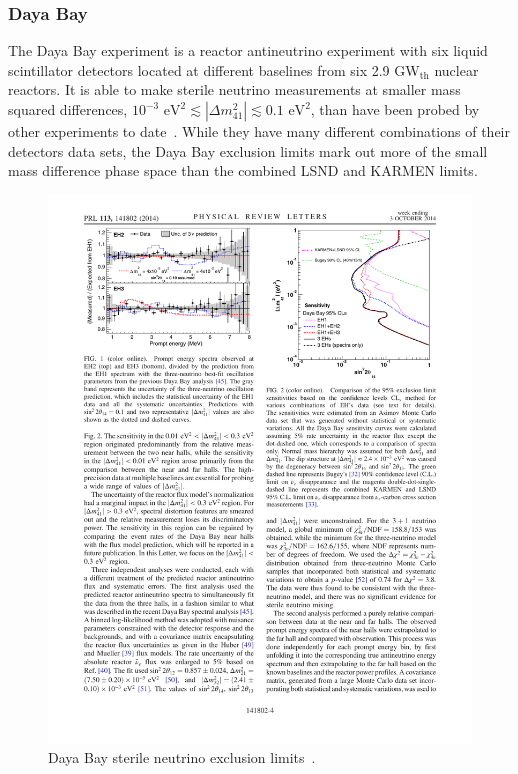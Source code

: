 \documentclass[aps,prd,twocolumn,nofootinbib]{revtex4-1}
\begin{document}
\subsubsection{Daya Bay}
The Daya Bay experiment is a reactor antineutrino experiment with six liquid scintillator detectors located at different baselines from six 2.9 GW$_\text{th}$ nuclear reactors. It is able to make sterile neutrino measurements at smaller mass squared differences, $10^{−3} \text{ eV}^2  \lesssim \left|\Delta m^{2}_{41}\right| \lesssim 0.1 \text{ eV}^2$, than have been probed by other experiments to date~\cite{DayaBay}. While they have many different combinations of their detectors data sets, the Daya Bay exclusion limits mark out more of the small mass difference phase space than the combined LSND and KARMEN limits.

\begin{figure}[H]
  \centering
  \includegraphics[width=1\columnwidth]{../figures/daya1.pdf}
  \caption{Daya Bay sterile neutrino exclusion limits~\cite{DayaBay}.}
  \label{fig:DayaBay}
\end{figure}
\end{document}

